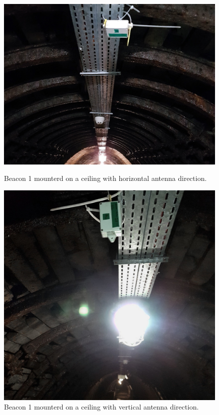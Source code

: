 \documentclass[../main.tex]{subfiles}
\begin{document}
\begin{figure}[ht]
\begin{minipage}{0.49\linewidth}
\includegraphics[width=\textwidth, trim={3cm 0 3cm 0},clip]{pictures/tests_beacon_celing_horizontal.pdf}
\caption{Beacon 1 mounterd on a ceiling with horizontal antenna direction.}
\label{fig:tests_beacon_celing_horizontal}
\end{minipage}\hfill%
\begin{minipage}{0.49\linewidth}
\includegraphics[width=\textwidth, trim={0 1cm 0 0},clip]{pictures/tests_beacon_celing_vertical.pdf}
\caption{Beacon 1 mounterd on a ceiling with vertical antenna direction.}
\label{fig:tests_beacon_celing_vertical}
\end{minipage}
\end{figure}
\end{document}
